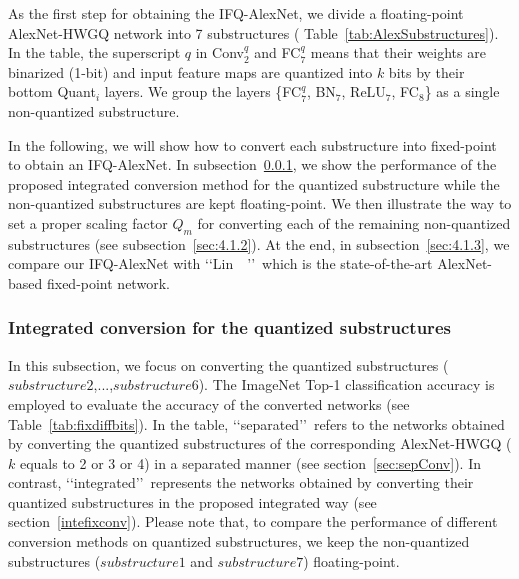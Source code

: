 \documentclass[10pt,twocolumn,letterpaper]{article}
\begin{document}
As the first step for obtaining the IFQ-AlexNet, we divide a floating-point AlexNet-HWGQ network into 7 substructures ( Table~\ref{tab:AlexSubstructures}). In the table, the superscript $q$ in Conv$^q_2$  and FC$^q_7$ means that their weights are binarized (1-bit) and input feature maps are quantized into $k$ bits by their bottom Quant$_i$ layers. We group the layers \{FC$^q_7$, BN$_7$, ReLU$_7$, FC$_8$\} as a single non-quantized substructure.

In the following, we will show how to convert each substructure into fixed-point to obtain an IFQ-AlexNet. In subsection~\ref{sec:4.1.1}, we show the performance of the proposed integrated conversion method for the quantized substructure while the non-quantized substructures are kept floating-point. We then illustrate the way to set a proper scaling factor $Q_m$ for converting each of the remaining non-quantized substructures (see subsection~\ref{sec:4.1.2}).  At the end, in subsection~\ref{sec:4.1.3}, we compare our IFQ-AlexNet with \lq\lq Lin~\etal~\cite{LinFixPoint}\rq\rq\, which is the state-of-the-art AlexNet-based fixed-point network.



\subsubsection{Integrated conversion for the quantized substructures} \label{sec:4.1.1}

In this subsection, we focus on converting the quantized substructures ($substructure2$,...,$substructure6$). The ImageNet Top-1 classification accuracy is employed to evaluate the accuracy of the converted networks (see Table~\ref{tab:fixdiffbits}). In the table, \lq\lq separated\rq\rq\, refers to the networks obtained by converting the quantized substructures of the corresponding AlexNet-HWGQ ($k$ equals to 2 or 3 or 4) in a separated manner (see section~\ref{sec:sepConv}). In contrast, \lq\lq integrated\rq\rq\, represents the networks obtained by converting their quantized substructures in the proposed integrated way (see section~\ref{intefixconv}). Please note that, to compare the performance of different conversion methods on quantized substructures, we keep the non-quantized substructures ($substructure1$ and $substructure7$) floating-point.
\end{document}

